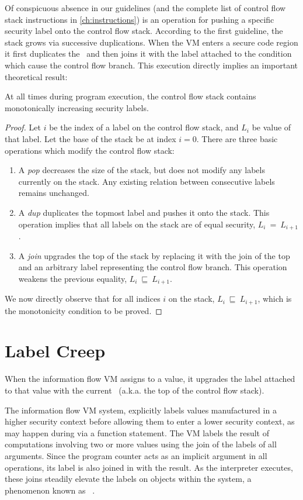 Of conspicuous absence in our guidelines (and the complete list of control flow stack instructions in \autoref{ch:instructions}) is an operation for pushing a specific security label onto the control flow stack.
According to the first guideline, the stack grows via successive duplications.
When the VM enters a secure code region it first duplicates the \pclabel\ and then joins it with the label attached to the condition which cause the control flow branch.
This execution directly implies an important theoretical result:
\begin{theorem}
  At all times during program execution, the control flow stack contains monotonically increasing security labels.
\end{theorem}
\begin{proof}
 Let $i$ be the index of a label on the control flow stack, and $L_i$ be value of that label.
 Let the base of the stack be at index $i=0$.
 There are three basic operations which modify the control flow stack:
 \begin{enumerate}
  \item A \textit{pop} decreases the size of the stack, but does not modify any labels currently on the stack. Any existing relation between consecutive labels remains unchanged.
  \item A \textit{dup} duplicates the topmost label and pushes it onto the stack. This operation implies that all labels on the stack are of equal security, $L_i~=~L_{i+1}$.
  \item A \textit{join} upgrades the top of the stack by replacing it with the join of the top and an arbitrary label representing the control flow branch. This operation weakens the previous equality, $L_i~\sqsubseteq~L_{i+1}$.
 \end{enumerate}
 We now directly observe that for all indices $i$ on the stack, $L_i~\sqsubseteq~L_{i+1}$, which is the monotonicity condition to be proved.
\end{proof}

\section{Label Creep}
When the information flow VM assigns to a value, it upgrades the label attached to that value with the current \pclabel\ (a.k.a. the top of the control flow stack).

The information flow VM system, explicitly labels values manufactured in a higher security context before allowing them to enter a lower security context, as may happen during via a function  statement.
The VM labels the result of computations involving two or more values using the join of the labels of all arguments.
Since the program counter acts as an implicit argument in all operations, its label is also joined in with the result.
As the interpreter executes, these joins steadily elevate the labels on objects within the system, a phenomenon known as ~\cite{sabelfeld.myers+03}.

